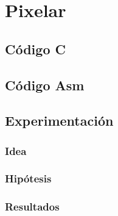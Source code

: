 \section{Pixelar}

\subsection{Código C}
	
\subsection{Código Asm}
	
	
	
\subsection{Experimentación}
\subsubsection{Idea}	

\subsubsection{Hipótesis}
	
	
\subsubsection{Resultados}
	